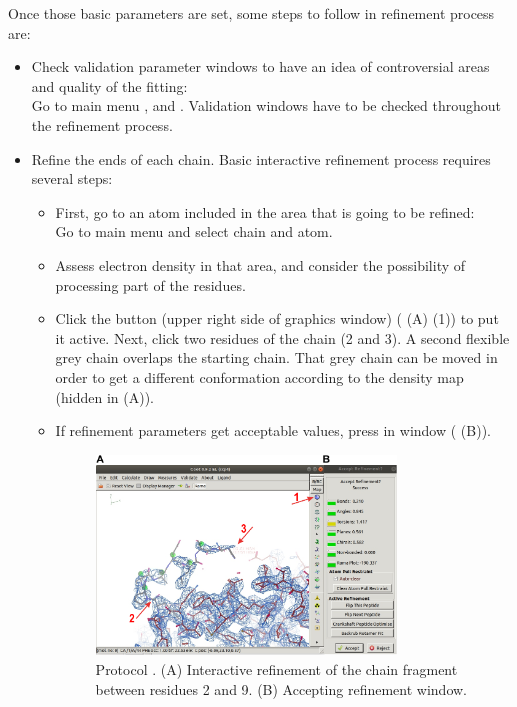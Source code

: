 \begin{itemize}
  Once those basic parameters are set, some steps to follow in refinement process are:
  \begin{itemize}
     \item Check validation parameter windows to have an idea of controversial areas and quality of the fitting:\\
     Go to \coot main menu ,  and . Validation windows have to be checked throughout the refinement process.
     \item Refine the ends of each chain. Basic interactive refinement process requires several steps:
      \begin{itemize}
      \item First, go to an atom included in the area that is going to be refined:\\
      Go to \coot main menu  and select chain and atom.
      \item Assess electron density in that area, and consider the possibility of processing part of the residues.
      \item Click the button  (upper right side of \coot graphics window)  ( (A) (1)) to put it active. Next, click two residues of the chain (2 and 3). A second flexible grey chain overlaps the starting chain. That grey chain can be moved in order to get a different conformation according to the density map (hidden in  (A)). 
      \item If refinement parameters get acceptable values, press  in  window ( (B)).
     
      \begin{figure}[H]
       \centering 
       \captionsetup{width=.9\linewidth} 
       \includegraphics[width=0.80\textwidth]{Images_appendix/Fig122.pdf}
       \caption{Protocol . (A) Interactive refinement of the chain fragment between residues 2 and 9. (B) Accepting refinement window.}
       \label{fig:app_protocol_coot_4}
      \end{figure}
     \end{itemize} 
     

\end{itemize}
\end{itemize}
